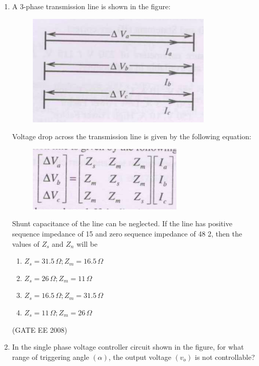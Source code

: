 \documentclass[journal,12pt,onecolumn]{IEEEtran}
\theoremstyle{remark}
\begin{document}
\begin{enumerate}[start=1, label=Q.\arabic*]
 \item  A 3-phase transmission line is shown in the figure:
 \begin{figure}[H]
     \centering
     \includegraphics[width=0.75\columnwidth]{Fig/q16-1.png}
     \label{fig:placeholder}
 \end{figure}
Voltage drop across the transmission line is given by the following equation:
\begin{figure}[H]
     \centering
     \includegraphics[width=0.75\columnwidth]{Fig/q16-2.png}
     \label{fig:placeholder}
 \end{figure}

Shunt capacitance of the line can be neglected. If the line has positive sequence impedance of 15
and zero sequence impedance of 48 2, then the values of $Z_s$ and $Z_n$ will be
\begin{multicols}{2}
    \begin{enumerate}[label=(\Alph*)]
        \item $Z_{s} = 31.5\, \Omega; Z_{m} = 16.5\, \Omega$
        \item $Z_{s} = 26\, \Omega; Z_{m} = 11\, \Omega$
        \item $Z_{s} = 16.5\, \Omega; Z_{m} = 31.5\, \Omega$
        \item $Z_{s} = 11\, \Omega; Z_{m} = 26\, \Omega$
    \end{enumerate}
\end{multicols}
\hfill (GATE EE 2008)


\item In the single phase voltage controller circuit shown in the figure, for what range of triggering angle $(\alpha)$, the output voltage $(v_{o})$ is not controllable?


\end{enumerate}
\end{document}
